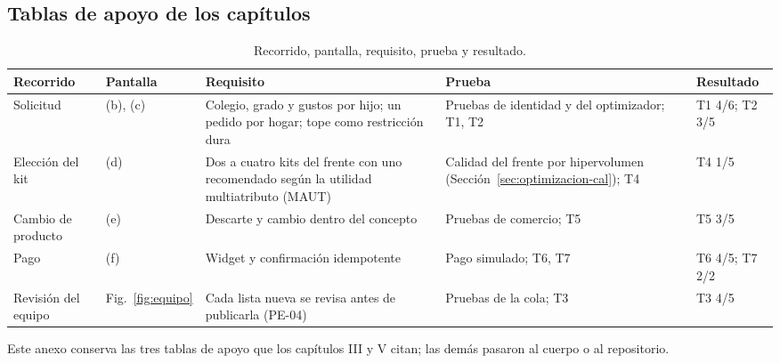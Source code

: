 \subsection{Tablas de apoyo de los capítulos}
\label{anx:tablas}

\begin{table}[!htb]
\centering
\footnotesize
\caption{Recorrido, pantalla, requisito, prueba y resultado.}
\label{tab:requisito-pantalla}
\begin{tabularx}{\textwidth}{@{}p{2.1cm}p{1.3cm}Xp{2.6cm}p{2.0cm}@{}}
\toprule
Recorrido & Pantalla & Requisito & Prueba & Resultado \\
\midrule
Solicitud & (b), (c) & Colegio, grado y gustos por hijo; un pedido por hogar; tope como restricción dura & Pruebas de identidad y del optimizador; T1, T2 & T1 4/6; T2 3/5 \\
Elección del kit & (d) & Dos a cuatro kits del frente con uno recomendado según la utilidad multiatributo (MAUT) & Calidad del frente por hipervolumen (Sección~\ref{sec:optimizacion-cal}); T4 & T4 1/5 \\
Cambio de producto & (e) & Descarte y cambio dentro del concepto & Pruebas de comercio; T5 & T5 3/5 \\
Pago & (f) & Widget y confirmación idempotente & Pago simulado; T6, T7 & T6 4/5; T7 2/2 \\
Revisión del equipo & Fig.~\ref{fig:equipo} & Cada lista nueva se revisa antes de publicarla (PE-04) & Pruebas de la cola; T3 & T3 4/5 \\
\bottomrule
\end{tabularx}
\end{table}


Este anexo conserva las tres tablas de apoyo que los capítulos III y V citan; las demás pasaron al cuerpo o al repositorio.

